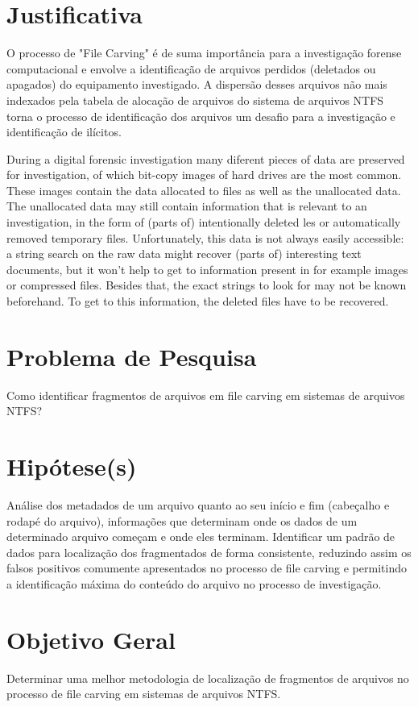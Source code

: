 \section{Justificativa}
O processo de "File Carving" é de suma importância para a investigação forense computacional e envolve a identificação de arquivos perdidos (deletados ou apagados) do equipamento investigado. A dispersão desses arquivos não mais indexados pela tabela de alocação de arquivos do sistema de arquivos NTFS torna o processo de identificação dos arquivos um desafio para a investigação e identificação de ilícitos.
\begin{citacao}
During a digital forensic investigation many diferent pieces of data are preserved for investigation, of which bit-copy images of hard drives are the most common. These images contain the data allocated to files as well as the unallocated data. The unallocated data may still contain information that is relevant to an investigation, in the form of (parts of) intentionally deleted les or automatically removed temporary files. Unfortunately, this data is not always easily accessible: a string search on the raw data might recover (parts of) interesting text documents, but it won't help to get to information present in for example images or compressed files. Besides that, the exact strings to look for may not be known beforehand. To get to this information, the deleted files have to be recovered. \cite{eindhoven}
\end{citacao}

\section{Problema de Pesquisa}
Como identificar fragmentos de arquivos em file carving em sistemas de arquivos NTFS?

\section{Hipótese(s)}
Análise dos metadados de um arquivo quanto ao seu início e fim (cabeçalho e rodapé do arquivo), informações que determinam onde os dados de um determinado arquivo começam e onde eles terminam.
Identificar um padrão de dados para localização dos fragmentados de forma consistente, reduzindo assim os falsos positivos comumente apresentados no processo de file carving e permitindo a identificação máxima do conteúdo do arquivo no processo de investigação.

\section{Objetivo Geral}
Determinar uma melhor metodologia de localização de fragmentos de arquivos no processo de file carving em sistemas de arquivos NTFS.

